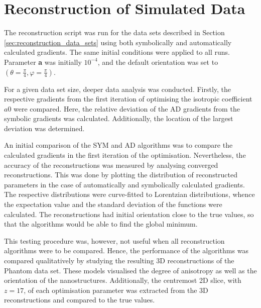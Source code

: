 

\section{Reconstruction of Simulated Data}\label{sec:pp_nanostructures_reconstruction}


The reconstruction script was run for the data sets described in Section \ref{sec:reconstruction_data_sets} using both symbolically and automatically calculated gradients.
The same initial conditions were applied to all runs.
Parameter \textbf{a} was initially $10^{-4}$, and the default orientation was set to $\left( \theta = \frac{\pi}{4}, \varphi = \frac{\pi}{4} \right)$.

For a given data set size, deeper data analysis was conducted.
Firstly, the respective gradients from the first iteration of optimising the isotropic coefficient $a0$ were compared.
Here, the relative deviation of the AD gradients from the symbolic gradients was calculated.
Additionally, the location of the largest deviation was determined.

An initial comparison of the SYM and AD algorithms was to compare the calculated gradients in the first iteration of the optimisation.
Nevertheless, the accuracy of the reconstructions was measured by analysing converged reconstructions.
This was done by plotting the distribution of reconstructed parameters in the case of automatically and symbolically calculated gradients.
The respective distributions were curve-fitted to Lorentzian distributions, whence the expectation value and the standard deviation of the functions were calculated.
The reconstructions had initial orientation close to the true values, so that the algorithms would be able to find the global minimum.

This testing procedure was, however, not useful when all reconstruction algorithms were to be compared.
Hence, the performance of the algorithms was compared qualitatively by studying the resulting 3D reconstructions of the Phantom data set.
These models visualised the degree of anisotropy as well as the orientation of the nanostructures.
Additionally, the centremost 2D slice, with $z = 17$, of each optimisation parameter was extracted from the 3D reconstructions and compared to the true values.

